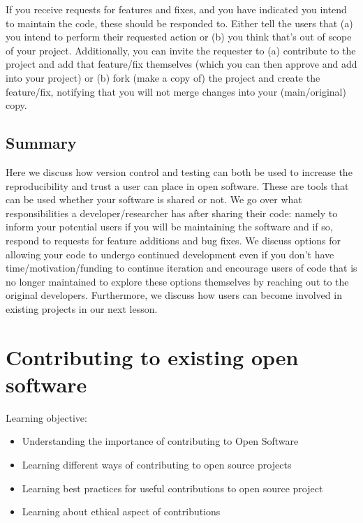\documentclass[
  letterpaper,
  DIV=11,
  numbers=noendperiod]{scrreport}
\providecommand{\tightlist}{%
  \setlength{\itemsep}{0pt}\setlength{\parskip}{0pt}}\usepackage{longtable,booktabs,array}
\begin{document}
If you receive requests for features and fixes, and you have indicated
you intend to maintain the code, these should be responded to. Either
tell the users that (a) you intend to perform their requested action or
(b) you think that's out of scope of your project. Additionally, you can
invite the requester to (a) contribute to the project and add that
feature/fix themselves (which you can then approve and add into your
project) or (b) fork (make a copy of) the project and create the
feature/fix, notifying that you will not merge changes into your
(main/original) copy.

\hypertarget{summary-7}{%
\section{Summary}\label{summary-7}}

Here we discuss how version control and testing can both be used to
increase the reproducibility and trust a user can place in open
software. These are tools that can be used whether your software is
shared or not. We go over what responsibilities a developer/researcher
has after sharing their code: namely to inform your potential users if
you will be maintaining the software and if so, respond to requests for
feature additions and bug fixes. We discuss options for allowing your
code to undergo continued development even if you don't have
time/motivation/funding to continue iteration and encourage users of
code that is no longer maintained to explore these options themselves by
reaching out to the original developers. Furthermore, we discuss how
users can become involved in existing projects in our next lesson.

\hypertarget{contributing-to-existing-open-software}{%
\chapter{Contributing to existing open
software}\label{contributing-to-existing-open-software}}

Learning objective:

\begin{itemize}
\tightlist
\item
  Understanding the importance of contributing to Open Software
\item
  Learning different ways of contributing to open source projects
\item
  Learning best practices for useful contributions to open source
  project
\item
  Learning about ethical aspect of contributions
\end{itemize}
\end{document}
